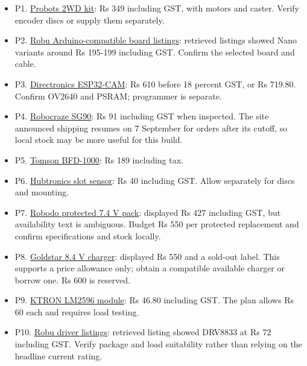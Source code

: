 \documentclass[10pt,a4paper]{article}
\begin{document}
\begin{itemize}
\item P1. \href{https://probots.co.in/2wd-clear-acrylic-smart-robot-chassis-car-kit.html}{Probots 2WD kit}: Rs 349 including GST, with motors and caster. Verify encoder discs or supply them separately.
\item P2. \href{https://robu.in/product-category/microcontroller-development-board/arduino-boards/arduino-board/}{Robu Arduino-compatible board listings}: retrieved listings showed Nano variants around Rs 195-199 including GST. Confirm the selected board and cable.
\item P3. \href{https://directronics.in/product/esp32-cam-wifi-module-camera-module}{Directronics ESP32-CAM}: Rs 610 before 18 percent GST, or Rs 719.80. Confirm OV2640 and PSRAM; programmer is separate.
\item P4. \href{https://robocraze.com/products/sg90-micro-servo-motor}{Robocraze SG90}: Rs 91 including GST when inspected. The site announced shipping resumes on 7 September for orders after its cutoff, so local stock may be more useful for this build.
\item P5. \href{https://www.tomsonelectronics.com/products/5-channel-line-tracking-sensor-module-bfd-1000}{Tomson BFD-1000}: Rs 189 including tax.
\item P6. \href{https://hubtronics.in/lm393-speed-measuring-sensor-module}{Hubtronics slot sensor}: Rs 40 including GST. Allow separately for discs and mounting.
\item P7. \href{https://robodo.in/products/li-ion-battery-7-4v-2200mah-2c-wth-inbuilt-charger-protection}{Robodo protected 7.4 V pack}: displayed Rs 427 including GST, but availability text is ambiguous. Budget Rs 550 per protected replacement and confirm specifications and stock locally.
\item P8. \href{https://goldstarstore.in/products/8-4v-1a-lithium-battery-charger-made-in-india-laptrust}{Goldstar 8.4 V charger}: displayed Rs 550 and a sold-out label. This supports a price allowance only; obtain a compatible available charger or borrow one. Rs 600 is reserved.
\item P9. \href{https://www.ktron.in/product/lm2596-step-down-module/}{KTRON LM2596 module}: Rs 46.80 including GST. The plan allows Rs 60 each and requires load testing.
\item P10. \href{https://robu.in/product-category/dc-motors/motor-drivers/stepper-motor-driver/}{Robu driver listings}: retrieved listing showed DRV8833 at Rs 72 including GST. Verify package and load suitability rather than relying on the headline current rating.

\end{itemize}
\end{document}
